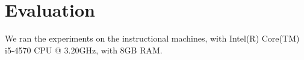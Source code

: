 \section{Evaluation}

We ran the experiments on the instructional machines, with Intel(R) Core(TM) i5-4570 CPU @ 3.20GHz, with 8GB RAM.


